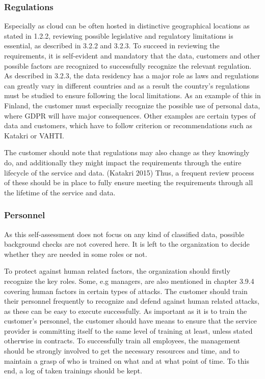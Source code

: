 \documentclass{article}
\begin{document}
\subsubsection{Regulations}
Especially as cloud can be often hosted in distinctive geographical locations as stated in 1.2.2, reviewing possible legislative and regulatory limitations is essential, as described in 3.2.2 and 3.2.3. To succeed in reviewing the requirements, it is self-evident and mandatory that the data, customers and other possible factors are recognized to successfully recognize the relevant regulation. As described in 3.2.3, the data residency has a major role as laws and regulations can greatly vary in different countries and as a result the country's regulations must be studied to ensure following the local limitations. As an example of this in Finland, the customer must especially recognize the possible use of personal data, where GDPR will have major consequences. Other examples are certain types of data and customers, which have to follow criterion or recommendations such as Katakri or VAHTI.
\par
The customer should note that regulations may also change as they knowingly do, and additionally they might impact the requirements through the entire lifecycle of the service and data. (Katakri 2015) Thus, a frequent review process of these should be in place to fully ensure meeting the requirements through all the lifetime of the service and data.

\subsubsection{Personnel}
As this self-assessment does not focus on any kind of classified data, possible background checks are not covered here. It is left to the organization to decide whether they are needed in some roles or not.
\par
To protect against human related factors, the organization should firstly recognize the key roles. Some, e.g managers, are also mentioned in chapter 3.9.4 covering human factors in certain types of attacks. The customer should train their personnel frequently to recognize and defend against human related attacks, as these can be easy to execute successfully. As important as it is to train the customer's personnel, the customer should have means to ensure that the service provider is committing itself to the same level of training at least, unless stated otherwise in contracts. To successfully train all employees, the management should be strongly involved to get the necessary resources and time, and to maintain a grasp of who is trained on what and at what point of time. To this end, a log of taken trainings should be kept.
\end{document}
